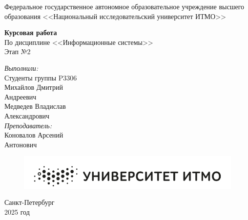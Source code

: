 \documentclass[12pt]{report}
\begin{document}
	
	\begin{titlepage}
		\begin{center}
			\large{Федеральное государственное автономное образовательное учреждение высшего образования <<Национальный исследовательский университет ИТМО>>}
		\end{center}
		
		\vspace{15em}
		
		\begin{center}
			\huge{\textbf{Курсовая работа}} \\
			\large{По дисциплине <<Информационные системы>>} \\
			\large{Этап №2} \\
		\end{center}
		
		\vspace{5em}
		
		\begin{flushright}
			\textit{\large{Выполнили:}} \\
			\large{Студенты группы P3306} \\
			\large{Михайлов Дмитрий} \\
			\large{Андреевич} \\
			\large{Медведев Владислав} \\
			\large{Александрович} \\
			\textit{\large{Преподаватель:}} \\
			\large{Коновалов Арсений} \\
			\large{Антонович}
		\end{flushright}
		
		\vspace{2cm}
		
		\begin{figure}[h]
			\centering
			\includegraphics[width=0.5\linewidth]{image.png}
		\end{figure}
		
		\begin{center}
			Санкт-Петербург \\
			2025 год
		\end{center}
	\end{titlepage}
	
	\tableofcontents
	\newpage
	
\end{document}
